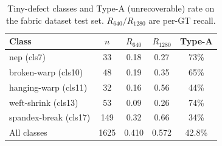 \begin{table}[t]
\centering
\caption{Tiny-defect classes and Type-A (unrecoverable) rate on the fabric dataset test
set. $R_{640}/R_{1280}$ are per-GT recall.}
\label{tab:ambiguity}
\begin{tabular}{lcccc}
\toprule
Class & $n$ & $R_{640}$ & $R_{1280}$ & Type-A \\
\midrule
nep (cls7)            & 33  & 0.18 & 0.27 & 73\% \\
broken-warp (cls10)   & 48  & 0.19 & 0.35 & 65\% \\
hanging-warp (cls11)  & 32  & 0.16 & 0.56 & 44\% \\
weft-shrink (cls13)   & 53  & 0.09 & 0.26 & 74\% \\
spandex-break (cls17) & 149 & 0.32 & 0.66 & 34\% \\
\midrule
All classes           & 1625 & 0.410 & 0.572 & 42.8\% \\
\bottomrule
\end{tabular}
\end{table}

